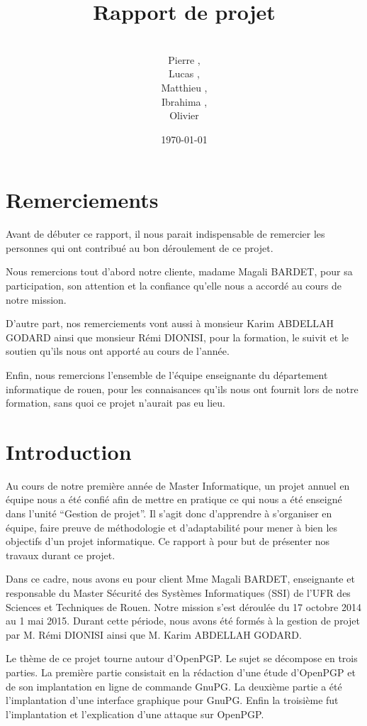 \documentclass{../res/univ-projet}
\title{Rapport de projet}
\author{\\ Pierre \bsc{Balmelle},\\ Lucas \bsc{Barbay}, \\ Matthieu \bsc{Fin},
\\ Ibrahima \bsc{Sory Barry},\\ Olivier \bsc{Thibault}}
\date{\today}
\begin{document}
\maketitle
\newpage
\section{Remerciements}
Avant de débuter ce rapport, il nous parait indispensable de remercier les 
personnes qui ont contribué au bon déroulement de ce projet.

Nous remercions tout d'abord notre cliente, madame Magali BARDET, pour sa 
participation, son attention et la confiance qu'elle nous a accordé au 
cours de notre mission.

D'autre part, nos remerciements vont aussi à monsieur Karim ABDELLAH 
GODARD ainsi que monsieur Rémi DIONISI, pour la formation, le suivit 
et le soutien qu'ils nous ont apporté au cours de l'année.

Enfin, nous remercions l'ensemble de l'équipe enseignante du département 
informatique de rouen, pour les connaisances qu'ils nous ont fournit lors 
de notre formation, sans quoi ce projet n'aurait pas eu lieu.
\newpage
\tableofcontents

\newpage

\section{Introduction}

Au cours de notre première année de Master Informatique, un projet annuel 
en équipe nous a été confié afin de mettre en pratique ce qui nous a 
été enseigné dans l'unité ``Gestion de projet''. Il s'agit donc d'apprendre 
à s'organiser en équipe, faire preuve de méthodologie et d'adaptabilité 
pour mener à bien les objectifs d'un projet informatique. Ce rapport à pour 
but de présenter nos travaux durant ce projet.

Dans ce cadre, nous avons eu pour client Mme Magali BARDET, enseignante et 
responsable du Master Sécurité des Systèmes Informatiques (SSI) de l'UFR des 
Sciences et Techniques de Rouen. Notre mission s'est déroulée du 17 octobre 
2014 au 1 mai 2015. Durant cette période, nous avons été formés à la 
gestion de projet par M. Rémi DIONISI ainsi que M. Karim ABDELLAH GODARD.

Le thème de ce projet tourne autour d'OpenPGP. Le sujet se décompose en trois 
parties. La première partie consistait en la rédaction d'une étude d'OpenPGP 
et de son implantation en ligne de commande GnuPG. La deuxième partie a été 
l'implantation d'une interface graphique pour GnuPG. Enfin la troisième fut 
l'implantation et l'explication d'une attaque sur OpenPGP.
\end{document}
